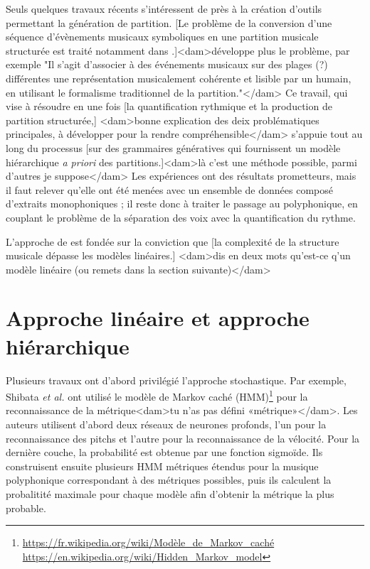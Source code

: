 Seuls quelques travaux récents s’intéressent de près à la création d’outils
permettant la génération de partition. [Le problème de la conversion d'une
séquence d'évènements musicaux symboliques en une partition musicale structurée
est traité notamment dans \cite{foscarin:hal-01988990}.]<dam>développe plus le
problème, par exemple "Il s'agit d'associer à des événements musicaux sur des
plages (?) différentes une représentation musicalement cohérente et lisible par
un humain, en utilisant le formalisme traditionnel de la partition."</dam> 
Ce travail, qui vise à résoudre en une fois 
[la quantification rythmique et la production de partition structurée,]
<dam>bonne explication des deix problématiques principales, à développer pour
la rendre compréhensible</dam> s’appuie tout au long du processus [sur des
grammaires génératives qui fournissent un modèle hiérarchique
\textit{a priori} des partitions.]<dam>là c'est une méthode possible, parmi
d'autres je suppose</dam> Les expériences ont des résultats prometteurs, mais
il faut relever qu’elle ont été menées avec un ensemble de données composé
d'extraits monophoniques ; 
il reste donc à traiter le passage au polyphonique, 
en couplant le problème de la séparation des voix avec la quantification du
rythme.

L'approche de \cite{foscarin:hal-01988990} est fondée sur la conviction 
que [la complexité de la structure musicale dépasse les modèles linéaires.]
<dam>dis en deux mots qu'est-ce q'un modèle linéaire (ou remets dans la section
suivante)</dam>

\section{Approche linéaire et approche hiérarchique}
Plusieurs travaux ont d’abord privilégié l’approche stochastique. Par exemple,
Shibata \textit{et al.} \cite{SHIBATA2021262} ont utilisé le modèle de Markov
caché (HMM)\footnote{
\url{https://fr.wikipedia.org/wiki/Modèle_de_Markov_caché}\\
\url{https://en.wikipedia.org/wiki/Hidden_Markov_model}} pour la reconnaissance
de la métrique<dam>tu n’as pas défini «métrique»</dam>. Les auteurs utilisent
d’abord deux réseaux de neurones profonds, l’un pour la reconnaissance des
pitchs et l’autre pour la reconnaissance de la vélocité. 
Pour la dernière couche, la probabilité est obtenue par une fonction sigmoïde.
Ils construisent ensuite plusieurs HMM métriques étendus pour la musique
polyphonique correspondant à des métriques possibles, puis ils calculent la
probalitité maximale pour chaque modèle afin d’obtenir la métrique la plus
probable.\newpage

